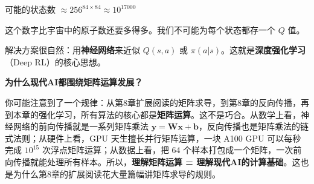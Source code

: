 可能的状态数 $\approx 256^{84 \times 84} \approx 10^{17000}$

这个数字比宇宙中的原子数还要多得多。我们不可能为每个状态都存一个 $Q$ 值。

解决方案很自然：用\textbf{神经网络}来近似 $Q(s, a)$ 或 $\pi(a|s)$。这就是\textbf{深度强化学习}（Deep RL）的核心思想。

\begin{insightbox}
\textbf{为什么现代AI都围绕矩阵运算发展？}

你可能注意到了一个规律：从第8章扩展阅读的矩阵求导，到第8章的反向传播，再到本章的强化学习，所有算法的核心都是\textbf{矩阵运算}。这不是巧合。从数学上看，神经网络的前向传播就是一系列矩阵乘法 $\bm{y} = \bm{W}\bm{x} + \bm{b}$，反向传播也是矩阵乘法的链式法则；从硬件上看，GPU 天生擅长并行矩阵运算，一块 A100 GPU 可以每秒完成 $10^{15}$ 次浮点矩阵运算；从数据上看，把 64 个样本打包成一个矩阵，一次前向传播就能处理所有样本。所以，\textbf{理解矩阵运算 = 理解现代AI的计算基础}。这也是为什么第8章的扩展阅读花大量篇幅讲矩阵求导的规则。
\end{insightbox}

